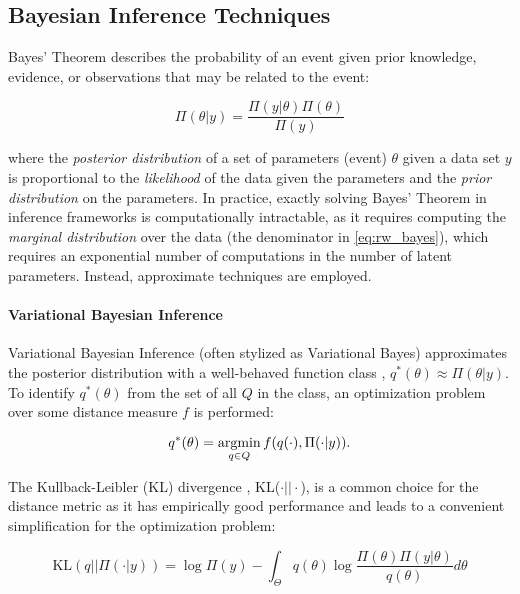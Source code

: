 \subsection{Bayesian Inference Techniques}
Bayes' Theorem \autocite{bayes1763lii} describes the probability of an event given prior knowledge, evidence, or observations that may be related to the event:

\begin{equation}
    \Pi(\theta | y) = \frac{\Pi(y | \theta)\Pi(\theta)}{\Pi(y)}
	\label{eq:rw_bayes}
\end{equation}

\noindent where the \emph{posterior distribution} of a set of parameters (event) $\theta$ given a data set $y$ is proportional to the \emph{likelihood} of the data given the parameters and the \emph{prior distribution} on the parameters. In practice, exactly solving Bayes' Theorem in inference frameworks is computationally intractable, as it requires computing the \emph{marginal distribution} over the data (the denominator in \cref{eq:rw_bayes}), which requires an exponential number of computations in the number of latent parameters. Instead, approximate techniques are employed.

\paragraph{Variational Bayesian Inference}
Variational Bayesian Inference (often stylized as Variational Bayes) approximates the posterior distribution with a well-behaved function class \autocite{wainwright2008graphical,bishop2006pattern}, $q^*(\theta) \approx \Pi(\theta | y)$. To identify $q^*(\theta)$ from the set of all $Q$ in the class, an optimization problem over some distance measure $f$ is performed:

\begin{equation}
    q^*(\theta) = \mathop\mathrm{arg min}_{q\in Q} f(q(\cdot),\Pi(\cdot|y)).
\end{equation}

The Kullback-Leibler (KL) divergence \autocite{kullback1951information}, KL($\cdot||\cdot$), is a common choice for the distance metric as it has empirically good performance \autocite{bishop2006pattern} and leads to a convenient simplification for the optimization problem:

\begin{equation}
    \text{KL}(q||\Pi(\cdot|y)) = \log \Pi(y) - \int_\Theta q(\theta) \log \frac{\Pi(\theta)\Pi(y|\theta)}{q(\theta)}d\theta
\end{equation}

